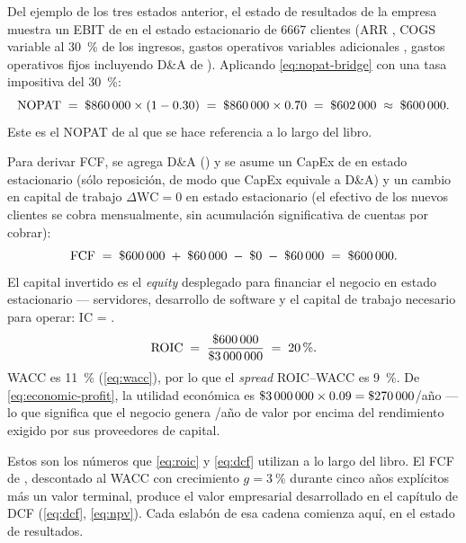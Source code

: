 \begin{example}
Del ejemplo de los tres estados anterior, el estado de resultados de la empresa muestra un EBIT de
 en el estado estacionario de \num{6667} clientes (ARR , COGS
variable  al \qty{30}{\percent} de los ingresos, gastos operativos variables
adicionales , gastos operativos fijos  incluyendo D\&A de
). Aplicando \cref{eq:nopat-bridge} con una tasa impositiva del \qty{30}{\percent}:
\[
  \mathrm{NOPAT} \;=\; \$\num{860000} \times (1 - 0.30) \;=\; \$\num{860000} \times 0.70 \;=\; \$\num{602000} \;\approx\; \$\num{600000}.
\]
Este es el NOPAT de  al que se hace referencia a lo largo del libro.

Para derivar FCF, se agrega D\&A () y se asume un CapEx de  en estado
estacionario (sólo reposición, de modo que CapEx equivale a D\&A) y un cambio en capital de trabajo
\(\Delta\mathrm{WC} = 0\) en estado estacionario (el efectivo de los nuevos clientes se cobra
mensualmente, sin acumulación significativa de cuentas por cobrar):
\[
  \mathrm{FCF} \;=\; \$\num{600000} \;+\; \$\num{60000} \;-\; \$\num{0} \;-\; \$\num{60000} \;=\; \$\num{600000}.
\]
El capital invertido es el \emph{equity} desplegado para financiar el negocio en estado estacionario
--- servidores, desarrollo de software y el capital de trabajo necesario para operar:
IC = .
\[
  \mathrm{ROIC} \;=\; \frac{\$\num{600000}}{\$\num{3000000}} \;=\; \qty{20}{\percent}.
\]
WACC es \qty{11}{\percent} (\cref{eq:wacc}), por lo que el \emph{spread} ROIC--WACC es
\qty{9}{\percent}. De \cref{eq:economic-profit}, la utilidad económica es
\(\$\num{3000000} \times 0.09 = \$\num{270000}\)/año --- lo que significa que el negocio genera
/año de valor por encima del rendimiento exigido por sus proveedores de capital.

Estos son los números que \cref{eq:roic} y \cref{eq:dcf} utilizan a lo largo del libro. El FCF de
, descontado al WACC con crecimiento \(g = \qty{3}{\percent}\) durante cinco años
explícitos más un valor terminal, produce el valor empresarial desarrollado en el capítulo de DCF
(\cref{eq:dcf}, \cref{eq:npv}). Cada eslabón de esa cadena comienza aquí, en el estado de
resultados.
\end{example}


